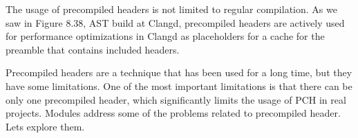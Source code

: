 The usage of precompiled headers is not limited to regular compilation. As we saw in Figure 8.38, AST build at Clangd, precompiled headers are actively used for performance optimizations in Clangd as placeholders for a cache for the preamble that contains included headers.

Precompiled headers are a technique that has been used for a long time, but they have some limitations. One of the most important limitations is that there can be only one precompiled header, which significantly limits the usage of PCH in real projects. Modules address some of the problems related to precompiled header. Lets explore them.
